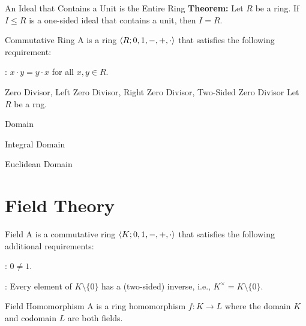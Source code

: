 \documentclass[12pt]{report}
\begin{document}
\begin{thmbox}{An Ideal that Contains a Unit is the Entire Ring}
	\textbf{Theorem:} Let $R$ be a ring. If $I \le R$ is a one-sided ideal that contains a unit, then $I = R$.
\end{thmbox}

\begin{dfnbox}{Commutative Ring}
	A  is a ring ${\langle {R; 0, 1, -, +, \cdot} \rangle}$ that satisfies the following requirement:
	\begin{dfnitems}
		\item {}: $x \cdot y = y \cdot x$ for all $x, y \in R$.
	\end{dfnitems}
\end{dfnbox}

\begin{dfnbox}{Zero Divisor, Left Zero Divisor, Right Zero Divisor, Two-Sided Zero Divisor}
	Let $R$ be a rng.
\end{dfnbox}

\begin{dfnbox}{Domain}
\end{dfnbox}

\begin{dfnbox}{Integral Domain}
\end{dfnbox}

\begin{dfnbox}{Euclidean Domain}
\end{dfnbox}



\chapter{Field Theory}

\begin{dfnbox}{Field}
	A  is a commutative ring ${\langle {K; 0, 1, -, +, \cdot} \rangle}$ that satisfies the following additional requirements:
	\begin{dfnitems}
		\item {}: $0 \ne 1$.
		\item {}: Every element of $K \setminus \{0\}$ has a (two-sided) inverse, i.e., $K^\times = K \setminus \{0\}$.
	\end{dfnitems}
\end{dfnbox}

\begin{dfnbox}{Field Homomorphism}
	A  is a ring homomorphism $f: K \to L$ where the domain $K$ and codomain $L$ are both fields.
\end{dfnbox}
\end{document}
